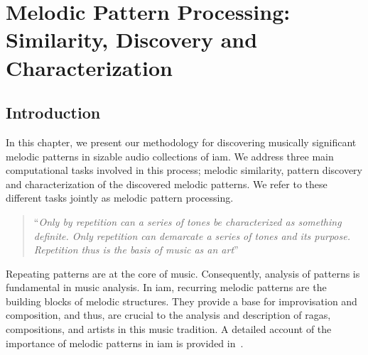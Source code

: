 
\chapter{Melodic Pattern Processing: Similarity, Discovery and Characterization}
\label{chap:melodic_pattern_processing}

\section{Introduction}
\label{sec:patterns_introduction}

In this chapter, we present our methodology for discovering musically significant melodic patterns in sizable audio collections of \gls{iam}. We address three main computational tasks involved in this process; melodic similarity, pattern discovery and characterization of the discovered melodic patterns. We refer to these different tasks jointly as melodic pattern processing.

\blockcquote[]{schenker1980harmony}{``\textit{Only by repetition can a series of tones be characterized as something definite. Only repetition can demarcate a series of tones and its purpose. Repetition thus is the basis of music as an art}''}

Repeating patterns are at the core of music. Consequently, analysis of patterns is fundamental in music analysis. In \gls{iam}, recurring melodic patterns are the building blocks of melodic structures. They provide a base for improvisation and composition, and thus, are crucial to the analysis and description of \glspl{raga}, compositions, and artists in this music tradition. A detailed account of the importance of melodic patterns in \gls{iam} is provided in~. 



